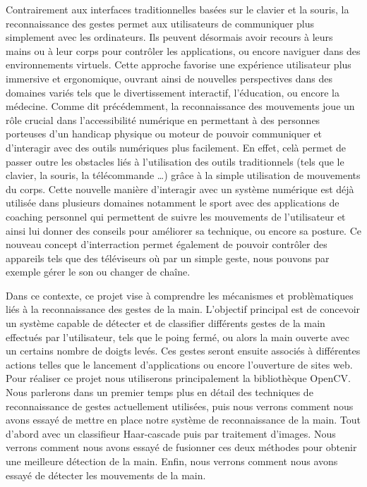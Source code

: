 \documentclass[11pt]{article}
\begin{document}
Contrairement aux interfaces traditionnelles basées sur le clavier et la souris, la reconnaissance des gestes permet aux utilisateurs de communiquer plus simplement avec les ordinateurs. Ils peuvent désormais avoir recours à leurs mains ou à leur corps pour contrôler les applications, ou encore naviguer dans des environnements virtuels. Cette approche favorise une expérience utilisateur plus immersive et ergonomique, ouvrant ainsi de nouvelles perspectives dans des domaines variés tels que le divertissement interactif, l'éducation, ou encore la médecine. Comme dit précédemment, la reconnaissance des mouvements joue un rôle crucial dans l’accessibilité numérique en permettant à des personnes porteuses d'un handicap physique  ou moteur de pouvoir communiquer et d'interagir avec des outils numériques plus facilement. En effet, celà permet de passer outre les obstacles liés à l’utilisation des outils traditionnels (tels que le clavier, la souris, la télécommande …) grâce à la simple utilisation de mouvements du corps. Cette nouvelle manière d'interagir avec un système numérique est déjà utilisée dans plusieurs domaines notamment le sport avec des applications de coaching personnel qui permettent de suivre les mouvements de l'utilisateur et ainsi lui donner des conseils pour améliorer sa technique, ou encore sa posture. Ce nouveau concept d'interraction permet également de pouvoir contrôler des appareils tels que des téléviseurs où par un simple geste, nous pouvons par exemple gérer le son ou changer de chaîne. \bigbreak

Dans ce contexte, ce projet vise à comprendre les mécanismes et problèmatiques liés à la reconnaissance des gestes de la main.
L'objectif principal est de concevoir un système capable de détecter et de classifier différents gestes de la main effectués par l'utilisateur,
tels que le poing fermé, ou alors la main ouverte avec un certains nombre de doigts levés. Ces gestes seront ensuite associés à différentes
actions telles que le lancement d'applications ou encore l'ouverture de sites web.
Pour réaliser ce projet nous utiliserons principalement la bibliothèque OpenCV. Nous parlerons dans un premier temps plus en détail des techniques de reconnaissance de gestes actuellement utilisées, puis nous verrons comment nous avons essayé de mettre en place notre système de reconnaissance de la main. Tout d'abord avec un classifieur Haar-cascade puis par traitement d'images. Nous verrons comment nous avons essayé de fusionner ces deux méthodes pour obtenir une meilleure détection de la main. Enfin, nous verrons comment nous avons essayé de détecter les mouvements de la main. 
\end{document}
